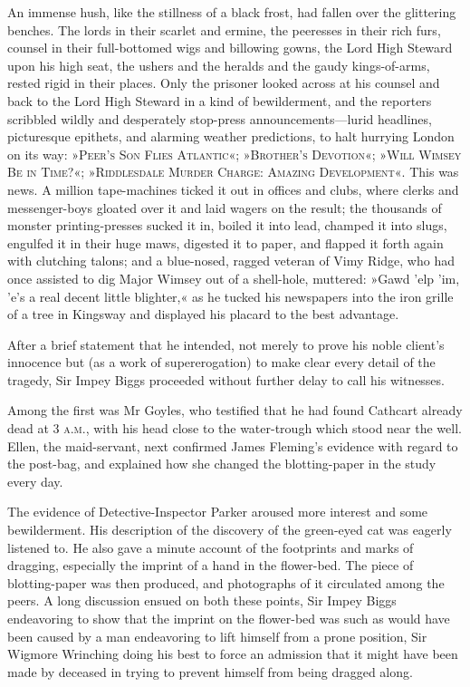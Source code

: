 An immense hush, like the stillness of a black frost, had fallen over the glittering benches. The lords in their scarlet and ermine, the peeresses in their rich furs, counsel in their full-bottomed wigs and billowing gowns, the Lord High Steward upon his high seat, the ushers and the heralds and the gaudy kings-of-arms, rested rigid in their places. Only the prisoner looked across at his counsel and back to the Lord High Steward in a kind of bewilderment, and the reporters scribbled wildly and desperately stop-press announcements\allowbreak---\allowbreak lurid headlines, picturesque epithets, and alarming weather predictions, to halt hurrying London on its way: »\textsc{Peer's Son Flies Atlantic}«; »\textsc{Brother's Devotion}«; »\textsc{Will Wimsey Be in Time?}«; »\textsc{Riddlesdale Murder Charge: Amazing Development}«. This was news. A million tape-machines ticked it out in offices and clubs, where clerks and messenger-boys gloated over it and laid wagers on the result; the thousands of monster printing-presses sucked it in, boiled it into lead, champed it into slugs, engulfed it in their huge maws, digested it to paper, and flapped it forth again with clutching talons; and a blue-nosed, ragged veteran of Vimy Ridge, who had once assisted to dig Major Wimsey out of a shell-hole, muttered: »Gawd 'elp 'im, 'e's a real decent little blighter,« as he tucked his newspapers into the iron grille of a tree in Kingsway and displayed his placard to the best advantage.

After a brief statement that he intended, not merely to prove his noble client's innocence but (as a work of supererogation) to make clear every detail of the tragedy, Sir Impey Biggs proceeded without further delay to call his witnesses.

Among the first was Mr Goyles, who testified that he had found Cathcart already dead at 3 \textsc{a.m.}, with his head close to the water-trough which stood near the well. Ellen, the maid-servant, next confirmed James Fleming's evidence with regard to the post-bag, and explained how she changed the blotting-paper in the study every day.

The evidence of Detective-Inspector Parker aroused more interest and some bewilderment. His description of the discovery of the green-eyed cat was eagerly listened to. He also gave a minute account of the footprints and marks of dragging, especially the imprint of a hand in the flower-bed. The piece of blotting-paper was then produced, and photographs of it circulated among the peers. A long discussion ensued on both these points, Sir Impey Biggs endeavoring to show that the imprint on the flower-bed was such as would have been caused by a man endeavoring to lift himself from a prone position, Sir Wigmore Wrinching doing his best to force an admission that it might have been made by deceased in trying to prevent himself from being dragged along.

